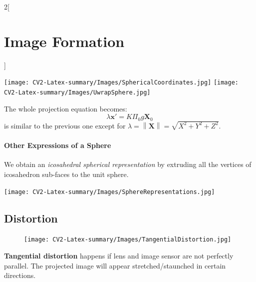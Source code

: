 \documentclass[oneside,fontsize=11pt,paper=a4]{scrartcl}
\newcommand\norm[1]{\left\lVert#1\right\rVert}
\newenvironment{myfigure}
  {\par\medskip\noindent\minipage{\linewidth}}
  {\endminipage\par\medskip}
\begin{document}
\begin{multicols}{2}[\section{Image Formation}]
\begin{myfigure}
    \texttt{[image: CV2-Latex-summary/Images/SphericalCoordinates.jpg]}
    \hfill
    \texttt{[image: CV2-Latex-summary/Images/UwrapSphere.jpg]}
\end{myfigure}

The whole projection equation becomes:
\begin{equation*}
    \lambda \boldsymbol{x}' = K \Pi_0 g \boldsymbol{X}_0
\end{equation*}
is similar to the previous one except for $\lambda = \norm{\boldsymbol{X}} = \sqrt{X^2 + Y^2 + Z^2}$.

\paragraph{Other Expressions of a Sphere} We obtain an \textit{icosahedral spherical representation} by extruding all the vertices of icosahedron sub-faces to the unit sphere.
\begin{center}
    \texttt{[image: CV2-Latex-summary/Images/SphereRepresentations.jpg]}
\end{center}

\subsection{Distortion}

\begin{figure}
    \texttt{[image: CV2-Latex-summary/Images/TangentialDistortion.jpg]}
\end{figure}
\textbf{Tangential distortion} happens if lens and image sensor are not perfectly parallel. The projected image will appear stretched/staunched in certain directions.


\end{multicols}
\end{document}
